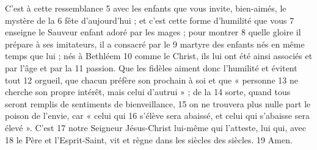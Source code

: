 C'est à cette ressemblance	 
5	 	avec les enfants que vous invite, bien-aimés, le mystère de la	 
6	 	fête d'aujourd'hui ; et c'est cette forme d'humilité que vous	 
7	 	enseigne le Sauveur enfant adoré par les mages ; pour montrer	 
8	 	quelle gloire il prépare à ses imitateurs, il a consacré par le	 
9	 	martyre des enfants nés en même temps que lui ; nés à Bethléem	 
10	 	comme le Christ, ils lui ont été ainsi associés et par l'âge et par la	 
11	 	passion. Que les fidèles aiment donc l'humilité et évitent tout	 
12	 	orgueil, que chacun préfère son prochain à soi et que « personne	 
13	 	ne cherche son propre intérêt, mais celui d'autrui » ; de la	 
14	 	sorte, quand tous seront remplis de sentiments de bienveillance,	 
15	 	on ne trouvera plus nulle part le poison de l'envie, car « celui qui	 
16	 	s'élève sera abaissé, et celui qui s'abaisse sera élevé ». C'est	 
17	 	notre Seigneur Jésus-Christ lui-même qui l'atteste, lui qui, avec	 
18	 	le Père et l'Esprit-Saint, vit et règne dans les siècles des siècles.	 
19	 	Amen.